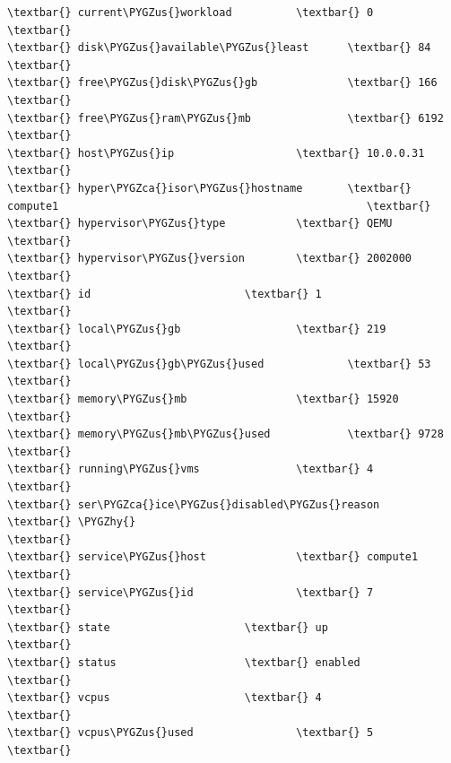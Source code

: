 \documentclass[letterpaper,10pt,english]{sphinxmanual}
\def\PYGZus{\char`\_}
\def\PYGZca{\char`\^}
\def\PYGZhy{\char`\-}
\begin{document}
\begin{enumerate}
\begin{Verbatim}[commandchars=\\\{\}]
\textbar{} current\PYGZus{}workload          \textbar{} 0                                                       \textbar{}
\textbar{} disk\PYGZus{}available\PYGZus{}least      \textbar{} 84                                                      \textbar{}
\textbar{} free\PYGZus{}disk\PYGZus{}gb              \textbar{} 166                                                     \textbar{}
\textbar{} free\PYGZus{}ram\PYGZus{}mb               \textbar{} 6192                                                    \textbar{}
\textbar{} host\PYGZus{}ip                   \textbar{} 10.0.0.31                                               \textbar{}
\textbar{} hyper\PYGZca{}isor\PYGZus{}hostname       \textbar{} compute1                                                \textbar{}
\textbar{} hypervisor\PYGZus{}type           \textbar{} QEMU                                                    \textbar{}
\textbar{} hypervisor\PYGZus{}version        \textbar{} 2002000                                                 \textbar{}
\textbar{} id                        \textbar{} 1                                                       \textbar{}
\textbar{} local\PYGZus{}gb                  \textbar{} 219                                                     \textbar{}
\textbar{} local\PYGZus{}gb\PYGZus{}used             \textbar{} 53                                                      \textbar{}
\textbar{} memory\PYGZus{}mb                 \textbar{} 15920                                                   \textbar{}
\textbar{} memory\PYGZus{}mb\PYGZus{}used            \textbar{} 9728                                                    \textbar{}
\textbar{} running\PYGZus{}vms               \textbar{} 4                                                       \textbar{}
\textbar{} ser\PYGZca{}ice\PYGZus{}disabled\PYGZus{}reason   \textbar{} \PYGZhy{}                                                       \textbar{}
\textbar{} service\PYGZus{}host              \textbar{} compute1                                                \textbar{}
\textbar{} service\PYGZus{}id                \textbar{} 7                                                       \textbar{}
\textbar{} state                     \textbar{} up                                                      \textbar{}
\textbar{} status                    \textbar{} enabled                                                 \textbar{}
\textbar{} vcpus                     \textbar{} 4                                                       \textbar{}
\textbar{} vcpus\PYGZus{}used                \textbar{} 5                                                       \textbar{}

\end{Verbatim}
\end{enumerate}
\end{document}
